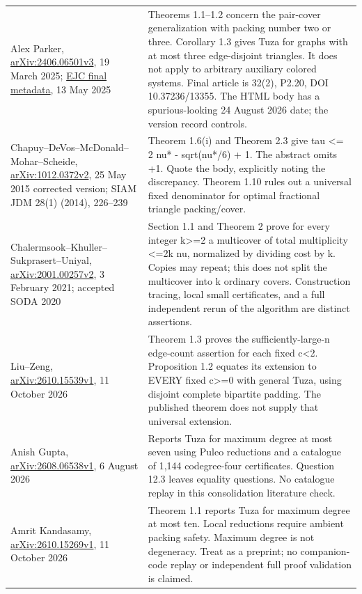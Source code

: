 \documentclass[11pt]{article}
\begin{document}
{\begin{longtable}[]{@{}
  >{\raggedright\arraybackslash}p{}
  >{\raggedright\arraybackslash}p{}@{}}
Alex Parker, \href{https://arxiv.org/html/2406.06501v3}{arXiv:2406.06501v3}, 19 March 2025; \href{https://www.combinatorics.org/ojs/index.php/eljc/article/view/v32i2p20}{EJC final metadata}, 13 May 2025 & Theorems 1.1--1.2 concern the pair-cover generalization with packing number two or three. Corollary 1.3 gives Tuza for graphs with at most three edge-disjoint triangles. It does not apply to arbitrary auxiliary colored systems. Final article is 32(2), P2.20, DOI 10.37236/13355. The HTML body has a spurious-looking 24 August 2026 date; the version record controls. \\
Chapuy--DeVos--McDonald--Mohar--Scheide, \href{https://arxiv.org/html/1012.0372v2}{arXiv:1012.0372v2}, 25 May 2015 corrected version; SIAM JDM 28(1) (2014), 226--239 & Theorem 1.6(i) and Theorem 2.3 give tau \textless= 2 nu* - sqrt(nu*/6) + 1. The abstract omits +1. Quote the body, explicitly noting the discrepancy. Theorem 1.10 rules out a universal fixed denominator for optimal fractional triangle packing/cover. \\
Chalermsook--Khuller--Sukprasert--Uniyal, \href{https://arxiv.org/pdf/2001.00257v2}{arXiv:2001.00257v2}, 3 February 2021; accepted SODA 2020 & Section 1.1 and Theorem 2 prove for every integer k\textgreater=2 a multicover of total multiplicity \textless=2k nu, normalized by dividing cost by k. Copies may repeat; this does not split the multicover into k ordinary covers. Construction tracing, local small certificates, and a full independent rerun of the algorithm are distinct assertions. \\
Liu--Zeng, \href{https://arxiv.org/html/2610.15539v1}{arXiv:2610.15539v1}, 11 October 2026 & Theorem 1.3 proves the sufficiently-large-n edge-count assertion for each fixed c\textless2. Proposition 1.2 equates its extension to EVERY fixed c\textgreater=0 with general Tuza, using disjoint complete bipartite padding. The published theorem does not supply that universal extension. \\
Anish Gupta, \href{https://arxiv.org/html/2608.06538v1}{arXiv:2608.06538v1}, 6 August 2026 & Reports Tuza for maximum degree at most seven using Puleo reductions and a catalogue of 1,144 codegree-four certificates. Question 12.3 leaves equality questions. No catalogue replay in this consolidation literature check. \\
Amrit Kandasamy, \href{https://arxiv.org/html/2610.15269v1}{arXiv:2610.15269v1}, 11 October 2026 & Theorem 1.1 reports Tuza for maximum degree at most ten. Local reductions require ambient packing safety. Maximum degree is not degeneracy. Treat as a preprint; no companion-code replay or independent full proof validation is claimed. \\

\end{longtable}}
\end{document}
